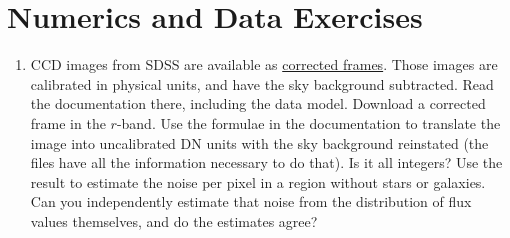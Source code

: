 \section{Numerics and Data Exercises}

\begin{enumerate}
\item CCD images from SDSS are available
as \href{https://www.sdss.org/dr14/imaging/images/#corr}{corrected
frames}. Those images are calibrated in physical units, and have the
sky background subtracted. Read the documentation there, including the
data model. Download a corrected frame in the $r$-band. Use the
formulae in the documentation to translate the image into uncalibrated
DN units with the sky background reinstated (the files have all the
information necessary to do that). Is it all integers?  Use the result
to estimate the noise per pixel in a region without stars or
galaxies. Can you independently estimate that noise from the
distribution of flux values themselves, and do the estimates agree?
\end{enumerate}


  
